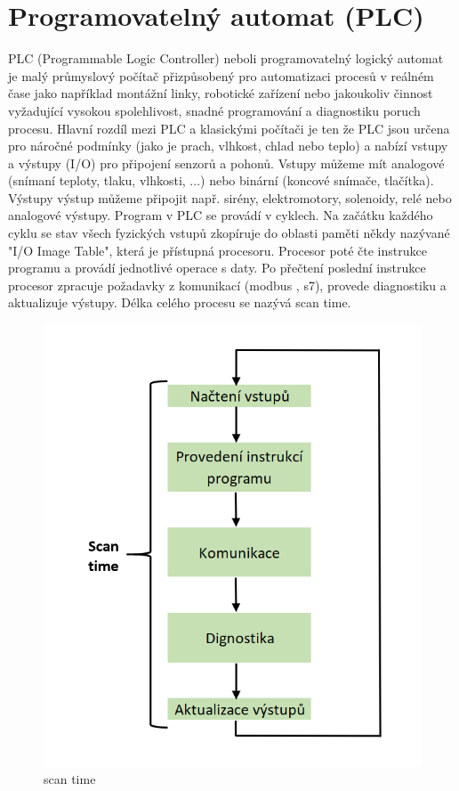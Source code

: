 \documentclass[a4paper,12pt,czech,bibliography=totoc]{scrbook}
\begin{document}
\section{Programovatelný automat (PLC)}
PLC (Programmable Logic Controller) neboli programovatelný logický automat je malý průmyslový počítač
přizpůsobený pro automatizaci procesů v reálném čase jako například montážní linky, robotické zařízení nebo
jakoukoliv činnost vyžadující vysokou spolehlivost, snadné programování a diagnostiku poruch procesu.
Hlavní rozdíl mezi PLC a klasickými počítači je ten že PLC jsou určena pro náročné podmínky (jako je prach,
vlhkost, chlad nebo teplo) a nabízí vstupy a výstupy (I/O) pro připojení senzorů a pohonů. Vstupy můžeme
mít analogové (snímaní teploty, tlaku, vlhkosti, ...) nebo binární (koncové snímače, tlačítka). Výstupy výstup
můžeme připojit např. sirény, elektromotory, solenoidy, relé nebo analogové výstupy.
\newline
\newline
 Program v PLC se provádí v cyklech. Na začátku každého cyklu se stav všech fyzických vstupů zkopíruje do oblasti paměti někdy nazývané "I/O Image Table", která je přístupná procesoru.  Procesor poté čte instrukce programu a provádí jednotlivé operace s daty. Po přečtení poslední instrukce procesor zpracuje požadavky z komunikací (modbus , s7), provede diagnostiku a aktualizuje výstupy. Délka celého procesu se nazývá scan time.
\cite{Berger2013}
\begin{figure}[h]
	\centering
	\includegraphics[scale = 0.6]{scanTime.PNG}
	\caption{scan time}
	\label{fig:my_label}
\end{figure}
\end{document}
